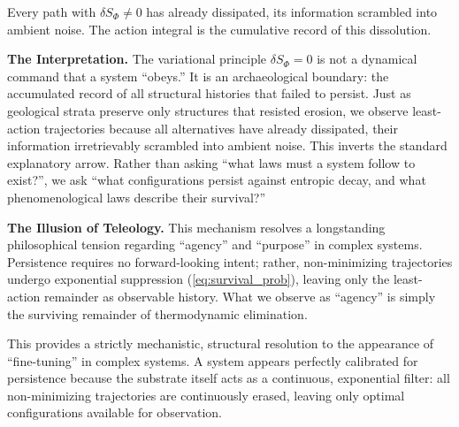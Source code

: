 Every path with $\delta S_\Phi \neq 0$ has already dissipated, its information scrambled into ambient noise. The action integral is the cumulative record of this dissolution. 

\textbf{The Interpretation.} The variational principle $\delta S_\Phi = 0$ is not a dynamical command that a system ``obeys.'' It is an archaeological boundary: the accumulated record of all structural histories that failed to persist. Just as geological strata preserve only structures that resisted erosion, we observe least-action trajectories because all alternatives have already dissipated, their information irretrievably scrambled into ambient noise. This inverts the standard explanatory arrow. Rather than asking ``what laws must a system follow to exist?'', we ask ``what configurations persist against entropic decay, and what phenomenological laws describe their survival?''

\textbf{The Illusion of Teleology.} This mechanism resolves a longstanding philosophical tension regarding ``agency'' and ``purpose'' in complex systems. Persistence requires no forward-looking intent; rather, non-minimizing trajectories undergo exponential suppression (\cref{eq:survival_prob}), leaving only the least-action remainder as observable history. What we observe as ``agency'' is simply the surviving remainder of thermodynamic elimination. 

This provides a strictly mechanistic, structural resolution to the appearance of ``fine-tuning'' in complex systems. A system appears perfectly calibrated for persistence because the substrate itself acts as a continuous, exponential filter: all non-minimizing trajectories are continuously erased, leaving only optimal configurations available for observation.
